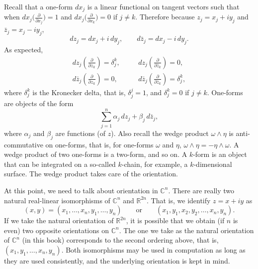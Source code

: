 \documentclass[12pt,openany]{book}
\newcommand{\C}{{\mathbb{C}}}
\newcommand{\R}{{\mathbb{R}}}
\theoremstyle{plain}
\theoremstyle{remark}
\theoremstyle{definition}
\theoremstyle{exercise}
\theoremstyle{example}
\begin{document}
Recall that a one-form $d x_j$ is a linear functional on tangent vectors
such that when $d x_j \bigl( \frac{\partial}{\partial x_j} \bigr) = 1$ and
$d x_j \bigl( \frac{\partial}{\partial x_k} \bigr) = 0$ if $j \not= k$.  Therefore because
$z_j = x_j + i y_j$ and
$\bar{z}_j = x_j - i y_j$,
%
\begin{equation*}
d z_j = d x_j + i \, d y_j , 
\qquad
d \bar{z}_j = d x_j - i \, d y_j . 
\end{equation*}
As expected,
\begin{equation*}
\begin{array}{lll}
d z_j \left( \frac{\partial}{\partial z_k} \right) = \delta_j^k ,
& \quad &
d z_j \left( \frac{\partial}{\partial \bar{z}_k} \right) = 0 , \\
d \bar{z}_j \left( \frac{\partial}{\partial z_k} \right) = 0 ,
& \quad &
d \bar{z}_j \left( \frac{\partial}{\partial \bar{z}_k} \right) = \delta_j^k
,
\end{array}
\end{equation*}
%
where $\delta_{j}^k$ is the Kronecker delta, that is, $\delta_j^j = 1$,
and $\delta_j^k = 0$ if $j \not= k$.  One-forms are objects of the form
\begin{equation*}
\sum_{j=1}^n \alpha_j \, d z_j + 
\beta_j \, d \bar{z}_j ,
\end{equation*}
where $\alpha_j$ and $\beta_j$ are functions (of $z$).
Also recall the wedge product $\omega \wedge \eta$ is anti-commutative on
one-forms,
that is, for one-forms $\omega$ and $\eta$,
$\omega \wedge \eta = - \eta \wedge \omega$.  A wedge product of two
one-forms is a two-form, and so on.  A $k$-form is an object that 
can be integrated on a so-called $k$-chain, for example, a
$k$-dimensional surface.  The wedge product takes care of the orientation.

At this point, we need to talk about orientation in $\C^n$.  There are really two
natural real-linear isomorphisms of $\C^n$ and $\R^{2n}$.  That is, we
identify $z = x+iy$ as
\begin{equation*}
(x,y) = (x_1,\ldots,x_n,y_1,\ldots,y_n) \qquad
\text{or} \qquad
(x_1,y_1,x_2,y_2,\ldots,x_n,y_n) .
\end{equation*}
If we take the natural orientation of $\R^{2n}$,
it is possible that we obtain (if $n$ is even)
two opposite orientations on $\C^n$.
The one we take as the natural orientation of $\C^n$ (in this book)
corresponds to
the second ordering above, that
is, $(x_1,y_1,\ldots,x_n,y_n)$.  Both isomorphisms may be used
in computation as long as they are used consistently, and the underlying
orientation is kept in mind.
\end{document}
